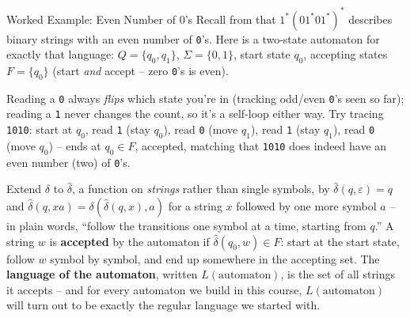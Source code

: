 \documentclass[full-course-notes.tex]{subfiles}
\begin{document}
\begin{examplebox}{Worked Example: Even Number of 0's}
Recall from  that $1^{*}(01^{*}01^{*})^{*}$ describes binary
strings with an even number of \texttt{0}'s. Here is a two-state automaton for exactly that
language: $Q = \{q_0, q_1\}$, $\Sigma = \{0,1\}$, start state $q_0$, accepting states
$F = \{q_0\}$ (start \emph{and} accept -- zero \texttt{0}'s is even).
\begin{center}
\end{center}
Reading a \texttt{0} always \emph{flips} which state you're in (tracking odd/even \texttt{0}'s
seen so far); reading a \texttt{1} never changes the count, so it's a self-loop either way. Try
tracing \texttt{1010}: start at $q_0$, read \texttt{1} (stay $q_0$), read \texttt{0} (move
$q_1$), read \texttt{1} (stay $q_1$), read \texttt{0} (move $q_0$) -- ends at $q_0 \in F$,
accepted, matching that \texttt{1010} does indeed have an even number (two) of \texttt{0}'s.
\end{examplebox}

\begin{coreidea}
Extend $\delta$ to $\hat\delta$, a function on \emph{strings} rather than single symbols, by
$\hat\delta(q, \varepsilon) = q$ and $\hat\delta(q, xa) = \delta(\hat\delta(q, x), a)$ for a
string $x$ followed by one more symbol $a$ -- in plain words, ``follow the transitions one
symbol at a time, starting from $q$.'' A string $w$ is \textbf{accepted} by the automaton if
$\hat\delta(q_0, w) \in F$: start at the start state, follow $w$ symbol by symbol, and end up
somewhere in the accepting set. The \textbf{language of the automaton}, written $L(\text{automaton})$,
is the set of all strings it accepts -- and for every automaton we build in this course,
$L(\text{automaton})$ will turn out to be exactly the regular language we started with.
\end{coreidea}
\end{document}
